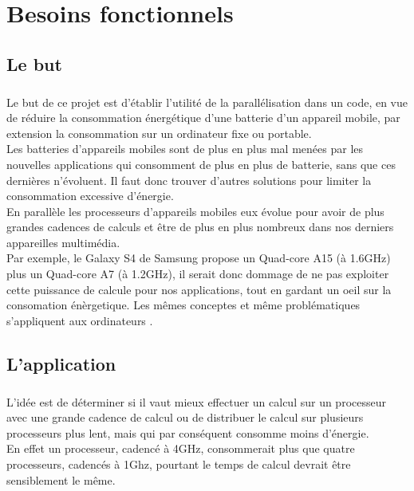 \chapter{Besoins fonctionnels}

\section{Le but}
\paragraph{}
	Le but de ce projet est d'établir l'utilité de la parallélisation dans un code, en vue de réduire la consommation énergétique d'une batterie d'un appareil mobile, par extension la consommation sur un ordinateur fixe ou portable. \\

	Les batteries d'appareils mobiles sont de plus en plus mal menées par les nouvelles applications qui consomment de plus en plus de batterie, sans que ces dernières n'évoluent. Il faut donc trouver d'autres solutions pour limiter la consommation excessive d'énergie.\\

	En parallèle les processeurs d'appareils mobiles eux évolue pour avoir de plus grandes cadences de calculs et être de plus en plus nombreux dans nos derniers appareilles multimédia.\\

	Par exemple, le Galaxy S4 de Samsung propose un Quad-core A15 (à 1.6GHz) plus un Quad-core A7 (à 1.2GHz), il serait donc dommage de ne pas exploiter cette puissance de calcule pour nos applications, tout en gardant un oeil sur la consomation énèrgetique. Les mêmes conceptes et même problématiques s'appliquent aux ordinateurs .\\

\section{L'application}
\paragraph{}
	L'idée est de déterminer si il vaut mieux effectuer un calcul sur un processeur avec une grande cadence de calcul ou de distribuer le calcul sur plusieurs processeurs plus lent, mais qui par conséquent consomme moins d'énergie. \\

	En effet un processeur, cadencé à 4GHz, consommerait plus que quatre processeurs, cadencés à 1Ghz, pourtant le temps de calcul devrait être sensiblement le même.\\

